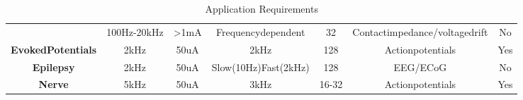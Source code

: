 \begin{table} 
    \begin{tabular}{ c c c c c c c }
         & 100Hz-20kHz & >1mA & Frequencydependent & 32 & Contactimpedance/voltagedrift & No \\ 
        \textbf{EvokedPotentials} & 2kHz & 50uA & 2kHz & 128 & Actionpotentials & Yes \\ 
        \textbf{Epilepsy} & 2kHz & 50uA & Slow(10Hz)Fast(2kHz) & 128 & EEG/ECoG & No \\ 
        \textbf{Nerve} & 5kHz & 50uA & 3kHz & 16-32 & Actionpotentials & Yes \\ 
    \end{tabular} 
    \caption{Application Requirements} 
\end{table}